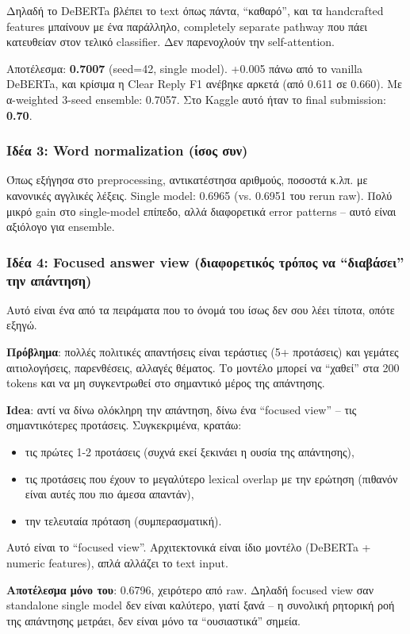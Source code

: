 \documentclass[12pt]{fphw}
\begin{document}
Δηλαδή το DeBERTa βλέπει το text όπως πάντα, ``καθαρό'', και τα handcrafted features μπαίνουν με ένα παράλληλο, completely separate pathway που πάει κατευθείαν στον τελικό classifier. Δεν παρενοχλούν την self-attention.

Αποτέλεσμα: \textbf{0.7007} (seed=42, single model). +0.005 πάνω από το vanilla DeBERTa, και κρίσιμα η Clear Reply F1 ανέβηκε αρκετά (από 0.611 σε 0.660). Με α-weighted 3-seed ensemble: 0.7057. Στο Kaggle αυτό ήταν το final submission: \textbf{0.70}.

\subsubsection{Ιδέα 3: Word normalization (ίσος συν)}

Όπως εξήγησα στο preprocessing, αντικατέστησα αριθμούς, ποσοστά κ.λπ. με κανονικές αγγλικές λέξεις. Single model: 0.6965 (vs. 0.6951 του rerun raw). Πολύ μικρό gain στο single-model επίπεδο, αλλά διαφορετικά error patterns -- αυτό είναι αξιόλογο για ensemble.

\subsubsection{Ιδέα 4: Focused answer view (διαφορετικός τρόπος να ``διαβάσει'' την απάντηση)}

Αυτό είναι ένα από τα πειράματα που το όνομά του ίσως δεν σου λέει τίποτα, οπότε εξηγώ.

\textbf{Πρόβλημα}: πολλές πολιτικές απαντήσεις είναι τεράστιες (5+ προτάσεις) και γεμάτες αιτιολογήσεις, παρενθέσεις, αλλαγές θέματος. Το μοντέλο μπορεί να ``χαθεί'' στα 200 tokens και να μη συγκεντρωθεί στο σημαντικό μέρος της απάντησης.

\textbf{Idea}: αντί να δίνω ολόκληρη την απάντηση, δίνω ένα ``focused view'' -- τις σημαντικότερες προτάσεις. Συγκεκριμένα, κρατάω:
\begin{itemize}
    \item τις πρώτες 1-2 προτάσεις (συχνά εκεί ξεκινάει η ουσία της απάντησης),
    \item τις προτάσεις που έχουν το μεγαλύτερο lexical overlap με την ερώτηση (πιθανόν είναι αυτές που πιο άμεσα απαντάν),
    \item την τελευταία πρόταση (συμπερασματική).
\end{itemize}
Αυτό είναι το ``focused view''. Αρχιτεκτονικά είναι ίδιο μοντέλο (DeBERTa + numeric features), απλά αλλάζει το text input.

\textbf{Αποτέλεσμα μόνο του}: 0.6796, χειρότερο από raw. Δηλαδή focused view σαν standalone single model δεν είναι καλύτερο, γιατί ξανά -- η συνολική ρητορική ροή της απάντησης μετράει, δεν είναι μόνο τα ``ουσιαστικά'' σημεία.
\end{document}
